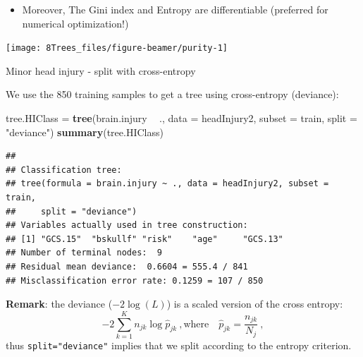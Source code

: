 \documentclass[10pt,ignorenonframetext,]{beamer}
\newenvironment{Shaded}{\begin{snugshade}}{\end{snugshade}}
\newcommand{\KeywordTok}[1]{\textcolor[rgb]{0.13,0.29,0.53}{\textbf{#1}}}
\newcommand{\DataTypeTok}[1]{\textcolor[rgb]{0.13,0.29,0.53}{#1}}
\newcommand{\StringTok}[1]{\textcolor[rgb]{0.31,0.60,0.02}{#1}}
\newcommand{\OperatorTok}[1]{\textcolor[rgb]{0.81,0.36,0.00}{\textbf{#1}}}
\newcommand{\NormalTok}[1]{#1}
\providecommand{\tightlist}{%
  \setlength{\itemsep}{0pt}\setlength{\parskip}{0pt}}
\begin{document}
\begin{frame}

\begin{itemize}
\tightlist
\item
  Moreover, The Gini index and Entropy are differentiable (preferred for
  numerical optimization!)
\end{itemize}

\begin{center}\texttt{[image: 8Trees\_files/figure-beamer/purity-1]} \end{center}

\end{frame}

\begin{frame}[fragile]

\begin{block}{Minor head injury - split with cross-entropy}

\vspace{1mm}

We use the 850 training samples to get a tree using cross-entropy
(deviance):

\scriptsize

\begin{Shaded}
\begin{Highlighting}[]
\NormalTok{tree.HIClass =}\StringTok{ }\KeywordTok{tree}\NormalTok{(brain.injury }\OperatorTok{~}\StringTok{ }\NormalTok{., }\DataTypeTok{data =}\NormalTok{ headInjury2, }\DataTypeTok{subset =}\NormalTok{ train, }
    \DataTypeTok{split =} \StringTok{"deviance"}\NormalTok{)}
\KeywordTok{summary}\NormalTok{(tree.HIClass)}
\end{Highlighting}
\end{Shaded}

\begin{verbatim}
## 
## Classification tree:
## tree(formula = brain.injury ~ ., data = headInjury2, subset = train, 
##     split = "deviance")
## Variables actually used in tree construction:
## [1] "GCS.15"  "bskullf" "risk"    "age"     "GCS.13" 
## Number of terminal nodes:  9 
## Residual mean deviance:  0.6604 = 555.4 / 841 
## Misclassification error rate: 0.1259 = 107 / 850
\end{verbatim}

\vspace{1mm} \textbf{Remark}: the deviance (\(-2\log(L)\)) is a scaled
version of the cross entropy:
\[-2\sum_{k=1}^K n_{jk} \log\hat{p}_{jk}\ , \text{where} \quad   \hat{p}_{jk}=\frac{n_{jk}}{N_j}\ , \]
thus \texttt{split="deviance"} implies that we split according to the
entropy criterion.

\end{block}

\end{frame}
\end{document}
